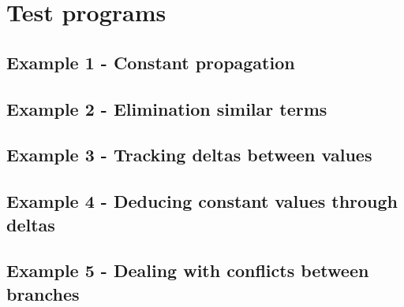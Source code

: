 \newpage
\section*{Test programs}
\subsection*{Example 1 - Constant propagation}
\subsection*{Example 2 - Elimination similar terms}
\subsection*{Example 3 - Tracking deltas between values}
\subsection*{Example 4 - Deducing constant values through deltas}
\subsection*{Example 5 - Dealing with conflicts between branches}
